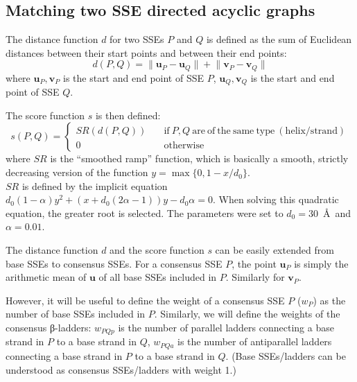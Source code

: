 \documentclass{article}
\begin{document}
\subsection{Matching two SSE directed acyclic graphs}
\label{sec:appendix_matching_dags}

The distance function \(d\) for two SSEs \(P\) and \(Q\) is defined 
as the sum of Euclidean distances between their start points and between their end points:
  \[  d(P, Q) = \lVert \mathbf{u}_P - \mathbf{u}_Q \rVert + \lVert \mathbf{v}_P - \mathbf{v}_Q \rVert  \]
where \(\mathbf{u}_P, \mathbf{v}_P\) is the start and end point of SSE \(P\), 
\(\mathbf{u}_Q, \mathbf{v}_Q\) is the start and end point of SSE \(Q\).

The score function \(s\) is then defined:
  \[
    s(P, Q) = \begin{cases}
                SR(d(P, Q)) \quad & \mathrm{if}\ P, Q\ \mathrm{are\ of\ the\ same\ type\ (helix/strand)} \\
                0           \quad & \mathrm{otherwise}
              \end{cases}
  \]
where \(SR\) is the ``smoothed ramp'' function, which is basically 
a smooth, strictly decreasing version of the function \(y = \max\{0, 1 - x/d_0\} \). \\
\(SR\) is defined by the implicit equation 
\(  d_0 (1 - \alpha) y^2 + (x + d_0 (2\alpha - 1)) y - d_0 \alpha = 0  \).
When solving this quadratic equation, the greater root is selected.
The parameters were set to \(d_0 = 30\)~\AA\ and \(\alpha = 0.01\).

The distance function \(d\) and the score function \(s\) can be easily 
extended from base SSEs to consensus SSEs. 
For a consensus SSE \(P\), the point \(\mathbf{u}_P\) is simply 
the arithmetic mean of \(\mathbf{u}\) of all base SSEs included in \(P\).
Similarly for \(\mathbf{v}_P\).

However, it will be useful to define the weight of a consensus SSE \(P\) (\(w_P\)) 
as the number of base SSEs included in \(P\).
Similarly, we will define the weights of the consensus β-ladders:
\(w_{PQp}\) is the number of parallel ladders connecting 
a base strand in \(P\) to a base strand in \(Q\),
\(w_{PQa}\) is the number of antiparallel ladders connecting 
a base strand in \(P\) to a base strand in \(Q\). 
(Base SSEs/ladders can be understood as consensus SSEs/ladders with weight 1.)
\end{document}
